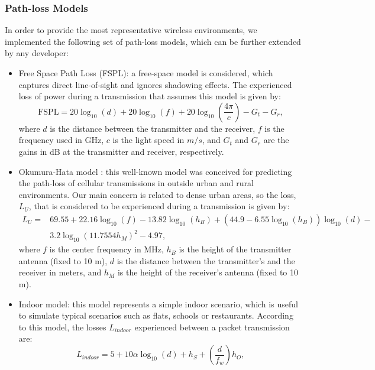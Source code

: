 \documentclass[a4paper]{article}
\begin{document}
		\subsubsection{Path-loss Models}
		In order to provide the most representative wireless environments, we implemented the following set of path-loss models, which can be further extended by any developer:
		\begin{itemize}
			\item Free Space Path Loss (FSPL): a free-space model is considered, which captures direct line-of-sight and ignores shadowing effects. The experienced loss of power during a transmission that assumes this model is given by:
			\begin{equation}
				\text{FSPL} = 20 \log_{10}(d) + 20 \log_{10}(f) + 20 \log_{10}(\frac{4\pi}{c}) - G_t - G_r,
				\nonumber
			\end{equation}
			where $d$ is the distance between the transmitter and the receiver, $f$ is the frequency used in GHz, $c$ is the light speed in $m/s$, and $G_t$ and $G_r$ are the gains in dB at the transmitter and receiver, respectively.
			\item Okumura-Hata model \cite{hata1980empirical}: this well-known model was conceived for predicting the path-loss of cellular transmissions in outside urban and rural environments. Our main concern is related to dense urban areas, so the loss, $L_U$, that is considered to be experienced during a transmission is given by: 
			\begin{equation}
			\begin{aligned}
				L_U =  &69.55 + 22.16 \log_{10}(f) - 13.82 \log_{10} (h_B) + (44.9 - 6.55 \log_{10}(h_B)) \log_{10}(d) - \\ 
				& 3.2 \log_{10}(11.7554 h_M)^2 - 4.97,
			\end{aligned}
			\nonumber
			\end{equation}
			where $f$ is the center frequency in MHz, $h_B$ is the height of the transmitter antenna (fixed to 10 m), $d$ is the distance between the transmitter's and the receiver in meters, and $h_M$ is the height of the receiver's antenna (fixed to 10 m).
			\item Indoor model: this model represents a simple indoor scenario, which is useful to simulate typical scenarios such as flats, schools or restaurants. According to this model, the losses $L_{indoor}$ experienced between a packet transmission are:		
			\begin{equation}
				L_{indoor} = 5 + 10 \alpha \log_{10}(d) + h_S + (\frac{d}{f_w}) h_O,

\end{equation}
\end{itemize}
\end{document}
